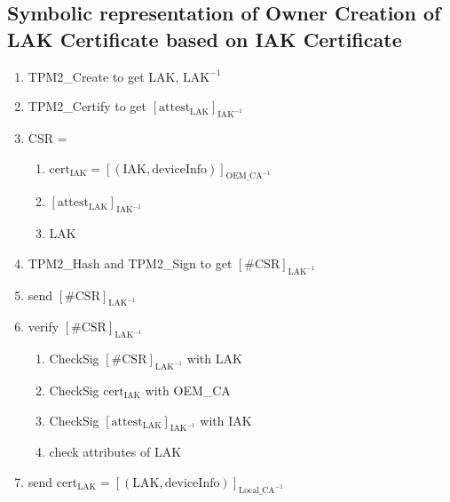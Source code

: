 \documentclass{article}
\begin{document}
\subsection*{Symbolic representation of Owner Creation of LAK Certificate based on IAK Certificate}
\begin{enumerate}
    \item TPM2\_Create to get LAK, $\text{LAK}^{-1}$
    \item TPM2\_Certify to get $[\text{attest}_\text{LAK}]_{\text{IAK}^{-1}}$
    \item CSR =
    \begin{enumerate}
        \item $\text{cert}_\text{IAK} = [(\text{IAK}, \text{deviceInfo})]_{\text{OEM\_CA}^{-1}}$
        \item $[\text{attest}_\text{LAK}]_{\text{IAK}^{-1}}$
        \item LAK
    \end{enumerate}
    \item TPM2\_Hash and TPM2\_Sign to get $[\text{\#CSR}]_{\text{LAK}^{-1}}$
    \item send $[\text{\#CSR}]_{\text{LAK}^{-1}}$
    \item verify $[\text{\#CSR}]_{\text{LAK}^{-1}}$
    \begin{enumerate}
        \item CheckSig $[\text{\#CSR}]_{\text{LAK}^{-1}}$ with LAK
        \item CheckSig $\text{cert}_\text{IAK}$ with OEM\_CA
        \item CheckSig $[\text{attest}_\text{LAK}]_{\text{IAK}^{-1}}$ with IAK
        \item check attributes of LAK
    \end{enumerate}
    \item send $\text{cert}_{\text{LAK}} = [(\text{LAK}, \text{deviceInfo})]_{\text{Local\_CA}^{-1}}$
\end{enumerate}
\end{document}
